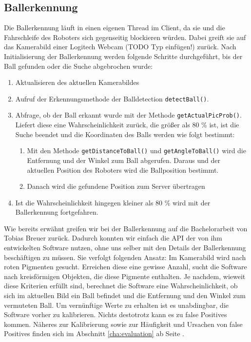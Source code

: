 \subsection{Ballerkennung}

\label{sec:balldetection}
Die Ballerkennung läuft in einen eigenen Thread im Client, da sie und
die Fahrschleife des Roboters sich gegenseitig blockieren
würden. Dabei greift sie auf das Kamerabild einer Logitech Webcam
(TODO Typ einfügen!) zurück. Nach Initialisierung der Ballerkennung
werden folgende Schritte durchgeführt, bis der Ball gefunden oder die
Suche abgebrochen wurde:
\begin{enumerate}
\item Aktualisieren des aktuellen Kamerabildes
\item Aufruf der Erkennungsmethode der Balldetection
  \lstinline|detectBall()|. 
\item Abfrage, ob der Ball erkannt wurde mit der Methode
  \lstinline|getActualPicProb()|. Liefert diese eine
  Wahrscheinlichkeit zurück, die größer als 80 \% ist, ist die Suche
  beendet und die Koordinaten des Balls werden wie folgt bestimmt:
  \begin{enumerate}
  \item Mit den Methode \lstinline|getDistanceToBall()| und
    \lstinline|getAngleToBall()| wird die Entfernung und der Winkel
    zum Ball abgerufen. Daraus und der aktuellen Position des Roboters
    wird die Ballposition bestimmt.
  \item Danach wird die gefundene Position zum Server übertragen
  \end{enumerate}
\item Ist die Wahrscheinlichkeit hingegen kleiner als 80 \% wird mit
  der Ballerkennung fortgefahren. 
\end{enumerate}

Wie bereits erwähnt greifen wir bei der Ballerkennung auf die
Bachelorarbeit von Tobias Breuer zurück. Dadurch konnten wir einfach
die API der von ihm entwickelten Software nutzen, ohne uns selber mit
den Details der Ballerkennung beschäftigen zu müssen. Sie verfolgt
folgenden Ansatz: Im Kamerabild wird nach roten Pigmenten
gesucht. Erreichen diese eine gewisse Anzahl, sucht die Software nach
kreisförmigen Objekten, die diese Pigmente enthalten. Je nachdem,
wieweit diese Kriterien erfüllt sind, berechnet die Software eine
Wahrscheinlichkeit, ob sich im aktuellen Bild ein Ball befindet und
die Entfernung und den Winkel zum vermuteten Ball. Um vernünftige
Werte zu erhalten ist es unabdingbar, die Software vorher zu
kalibrieren. Nichts destotrotz kann es zu false Positives
kommen. Näheres zur Kalibrierung sowie zur Häufigkeit und Ursachen von
false Positives finden sich im Abschnitt \ref{cha:evaluation} ab Seite \pageref{cha:evaluation}.
